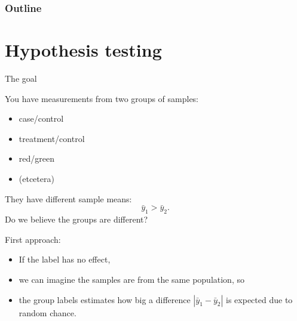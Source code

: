 %
%
%



\subtitle{hypothesis testing, and the $t$ statistic}

\date{8 October 2015}





\begin{frame}
  \maketitle
\end{frame}


\begin{frame}\frametitle<presentation>{Outline}
  \tableofcontents
\end{frame}


\section{Hypothesis testing}

\begin{frame}{The goal}

    You have measurements from two groups of samples:
    \begin{itemize}
        \item case/control
        \item treatment/control
        \item red/green
        \item (etcetera)
    \end{itemize}

    \vspace{2em}

    They have different \alert{sample} means:
    \[  \bar y_1 > \bar y_2 . \]
    Do we believe the groups are different?

    \vspace{2em}
    \pause

    \begin{block}{First approach:}
      \begin{itemize}
        \item If the label has no effect,
        \item we can imagine the samples are from the \alert{same population}, so
        \item {} the \alert{group labels}
          estimates how big a difference $|\bar y_1 - \bar y_2|$ is expected 
          due to random chance.
      \end{itemize}
    \end{block}

\end{frame}


